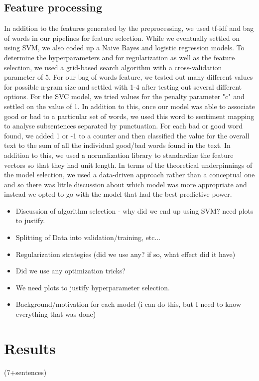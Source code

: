 \documentclass{amsart}
\theoremstyle{definition}
\theoremstyle{remark}
\numberwithin{equation}{section}
\begin{document}
\subsection{Feature processing}
	In addition to the features generated by the preprocessing, we used tf-idf and bag of words in our pipelines for feature selection.  While we eventually settled on using SVM, we also coded up a Naive Bayes and logistic regression models.  To determine the hyperparameters and for regularization as well as the feature selection, we used a grid-based search algorithm with a cross-validation parameter of 5.  For our bag of words feature, we tested out many different values for possible n-gram size and settled with 1-4 after testing out several different options.  For the SVC model, we tried values for the penalty parameter "c" and settled on the value of 1.  In addition to this, once our model was able to associate good or bad to a particular set of words, we used this word to sentiment mapping to analyse subsentences separated by punctuation.  For each bad or good word found, we added 1 or -1 to a counter and then classified the value for the overall text to the sum of all the individual good/bad words found in the text.  In addition to this, we used a normalization library to standardize the feature vectors so that they had unit length.  In terms of the theoretical underpinnings of the model selection, we used a data-driven approach rather than a conceptual one and so there was little discussion about which model was more appropriate and instead we opted to go with the model that had the best predictive power.
	\begin{itemize}
	\item Discussion of algorithm selection - why did we end up using SVM?  need plots to justify.
	\item Splitting of Data into validation/training, etc...
	\item Regularization strategies (did we use any?  if so, what effect did it have)
	\item Did we use any optimization tricks?
	\item We need plots to justify hyperparameter selection.
	\item Background/motivation for each model (i can do this, but I need to know everything that was done)
\end{itemize}
\section{Results} (7+sentences)
\end{document}
